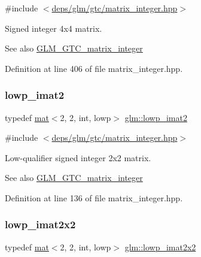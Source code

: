 {\ttfamily \#include $<$\hyperlink{matrix__integer_8hpp}{deps/glm/gtc/matrix\+\_\+integer.\+hpp}$>$}

Signed integer 4x4 matrix. \begin{DoxySeeAlso}{See also}
\hyperlink{group__gtc__matrix__integer}{G\+L\+M\+\_\+\+G\+T\+C\+\_\+matrix\+\_\+integer} 
\end{DoxySeeAlso}


Definition at line 406 of file matrix\+\_\+integer.\+hpp.

\mbox{\label{group__gtc__matrix__integer_gae4e37c11bd4e1d22eaf128792a7a0030}} 
\subsubsection{\texorpdfstring{lowp\+\_\+imat2}{lowp\_imat2}}
{\footnotesize\ttfamily typedef \hyperlink{structglm_1_1mat}{mat}$<$2, 2, int, lowp$>$ \hyperlink{group__gtc__matrix__integer_gae4e37c11bd4e1d22eaf128792a7a0030}{glm\+::lowp\+\_\+imat2}}



{\ttfamily \#include $<$\hyperlink{matrix__integer_8hpp}{deps/glm/gtc/matrix\+\_\+integer.\+hpp}$>$}

Low-\/qualifier signed integer 2x2 matrix. \begin{DoxySeeAlso}{See also}
\hyperlink{group__gtc__matrix__integer}{G\+L\+M\+\_\+\+G\+T\+C\+\_\+matrix\+\_\+integer} 
\end{DoxySeeAlso}


Definition at line 136 of file matrix\+\_\+integer.\+hpp.

\mbox{\label{group__gtc__matrix__integer_gab3548c407d85abacc0ee73eeb91169a0}} 
\subsubsection{\texorpdfstring{lowp\+\_\+imat2x2}{lowp\_imat2x2}}
{\footnotesize\ttfamily typedef \hyperlink{structglm_1_1mat}{mat}$<$2, 2, int, lowp$>$ \hyperlink{group__gtc__matrix__integer_gab3548c407d85abacc0ee73eeb91169a0}{glm\+::lowp\+\_\+imat2x2}}



